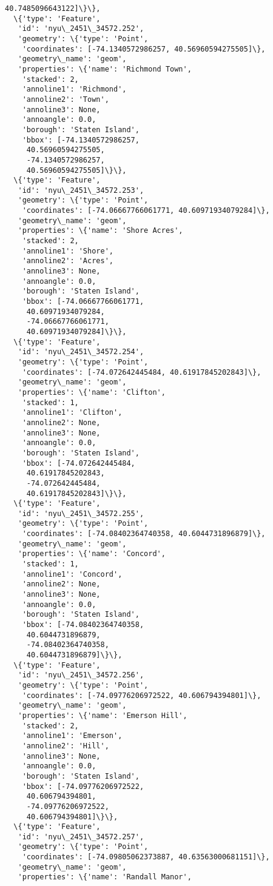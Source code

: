 \documentclass[11pt]{article}
\begin{document}
\begin{tcolorbox}[breakable, size=fbox, boxrule=.5pt, pad at break*=1mm, opacityfill=0]
\begin{Verbatim}[commandchars=\\\{\}]
     40.7485096643122]\}\},
  \{'type': 'Feature',
   'id': 'nyu\_2451\_34572.252',
   'geometry': \{'type': 'Point',
    'coordinates': [-74.1340572986257, 40.56960594275505]\},
   'geometry\_name': 'geom',
   'properties': \{'name': 'Richmond Town',
    'stacked': 2,
    'annoline1': 'Richmond',
    'annoline2': 'Town',
    'annoline3': None,
    'annoangle': 0.0,
    'borough': 'Staten Island',
    'bbox': [-74.1340572986257,
     40.56960594275505,
     -74.1340572986257,
     40.56960594275505]\}\},
  \{'type': 'Feature',
   'id': 'nyu\_2451\_34572.253',
   'geometry': \{'type': 'Point',
    'coordinates': [-74.06667766061771, 40.60971934079284]\},
   'geometry\_name': 'geom',
   'properties': \{'name': 'Shore Acres',
    'stacked': 2,
    'annoline1': 'Shore',
    'annoline2': 'Acres',
    'annoline3': None,
    'annoangle': 0.0,
    'borough': 'Staten Island',
    'bbox': [-74.06667766061771,
     40.60971934079284,
     -74.06667766061771,
     40.60971934079284]\}\},
  \{'type': 'Feature',
   'id': 'nyu\_2451\_34572.254',
   'geometry': \{'type': 'Point',
    'coordinates': [-74.072642445484, 40.61917845202843]\},
   'geometry\_name': 'geom',
   'properties': \{'name': 'Clifton',
    'stacked': 1,
    'annoline1': 'Clifton',
    'annoline2': None,
    'annoline3': None,
    'annoangle': 0.0,
    'borough': 'Staten Island',
    'bbox': [-74.072642445484,
     40.61917845202843,
     -74.072642445484,
     40.61917845202843]\}\},
  \{'type': 'Feature',
   'id': 'nyu\_2451\_34572.255',
   'geometry': \{'type': 'Point',
    'coordinates': [-74.08402364740358, 40.6044731896879]\},
   'geometry\_name': 'geom',
   'properties': \{'name': 'Concord',
    'stacked': 1,
    'annoline1': 'Concord',
    'annoline2': None,
    'annoline3': None,
    'annoangle': 0.0,
    'borough': 'Staten Island',
    'bbox': [-74.08402364740358,
     40.6044731896879,
     -74.08402364740358,
     40.6044731896879]\}\},
  \{'type': 'Feature',
   'id': 'nyu\_2451\_34572.256',
   'geometry': \{'type': 'Point',
    'coordinates': [-74.09776206972522, 40.606794394801]\},
   'geometry\_name': 'geom',
   'properties': \{'name': 'Emerson Hill',
    'stacked': 2,
    'annoline1': 'Emerson',
    'annoline2': 'Hill',
    'annoline3': None,
    'annoangle': 0.0,
    'borough': 'Staten Island',
    'bbox': [-74.09776206972522,
     40.606794394801,
     -74.09776206972522,
     40.606794394801]\}\},
  \{'type': 'Feature',
   'id': 'nyu\_2451\_34572.257',
   'geometry': \{'type': 'Point',
    'coordinates': [-74.09805062373887, 40.63563000681151]\},
   'geometry\_name': 'geom',
   'properties': \{'name': 'Randall Manor',

\end{Verbatim}
\end{tcolorbox}
\end{document}
